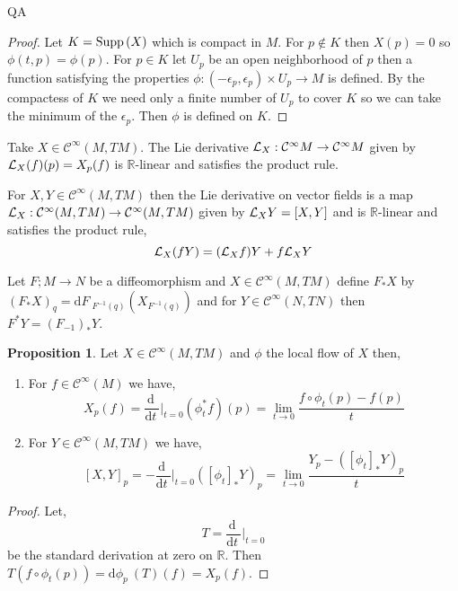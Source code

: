 QA	 \documentclass[12pt]{extarticle}
\newcommand{\R}{\mathbb{R}}
\renewcommand{\d}[1]{ \mathrm{d}#1 \:}
\newcommand{\deriv}[2]{\frac{\d{#1}}{\d{#2}}}
\theoremstyle{definition}
\newtheorem{proposition}[theorem]{Proposition}
\newenvironment{definition}[1][Definition:]{\begin{trivlist}
\item[\hskip \labelsep {\bfseries #1}]}{\end{trivlist}}
\newcommand{\C}[1]{\mathcal{C}^{#1}}
\begin{document}
\begin{proof}
Let $K = \mathrm{Supp}\left( X \right)$ which is compact in $M$. For $p \notin K$ then $X(p) = 0$ so $\phi(t, p) = \phi(p)$. For $p \in K$ let $U_p$ be an open neighborhood of $p$ then a function satisfying the properties $\phi : (-\epsilon_p, \epsilon_p) \times U_p \to M$ is defined. By the compactess of $K$ we need only a finite number of $U_p$ to cover $K$ so we can take the minimum of the $\epsilon_p$. Then $\phi$ is defined on $K$. 
\end{proof}

\begin{definition}
Take $X \in \C{\infty}(M, TM)$. The Lie derivative $\L_X : \C{\infty}{M} \to \C{\infty}{M}$ given by $\mathcal{L}_X(f)(p) = X_p(f)$ is $\R$-linear and satisfies the product rule. 
\end{definition}

\begin{definition}
For $X,Y \in \C{\infty}(M, TM)$ then the Lie derivative on vector fields is a map $\L_X : \C{\infty}(M, TM) \to \C{\infty}(M, TM)$ given by $\mathcal{L}_X Y = [X, Y]$ and is $\R$-linear and satisfies the product rule,
\[ \mathcal{L}_X(fY) = (\mathcal{L}_X f) Y + f \mathcal{L}_X Y \]
\end{definition}

\begin{definition}
Let $F ; M \to N$ be a diffeomorphism and $X \in \C{\infty}(M, TM)$ define $F_* X$ by $(F_* X)_q =  \d{F}_{F^{-1}(q)}  \left( X_{F^{-1}(q)} \right)$ and for $Y \in \C{\infty}(N, TN)$ then $F^* Y = (F_{-1})_* Y$. 
\end{definition}

\begin{proposition}
Let $X \in \C{\infty}(M, TM)$ and $\phi$ the local flow of $X$ then,
\begin{enumerate}
\item For $f \in \C{\infty}(M)$ we have,
\[ X_p(f) = \deriv{}{t} \bigg|_{t = 0} \left( \phi_t^* f \right)(p) = \lim_{t \to 0} \frac{f \circ \phi_t(p) - f(p)}{t} \]
\item For $Y \in \C{\infty}(M, TM)$ we have,
\[ [X, Y]_p = - \deriv{}{t} \bigg|_{t = 0} \left( [\phi_t]_* Y \right)_p = \lim_{t \to 0} \frac{Y_p - ([\phi_t]_* Y)_p}{t} \]
\end{enumerate}
\end{proposition}

\begin{proof}
Let,
\[ T = \deriv{}{t} \bigg|_{t = 0}\]
be the standard derivation at zero on $\R$. Then $T(f \circ \phi_t(p)) = \d{\phi_p}(T)(f) = X_p(f)$. 
\end{proof}
\end{document}
